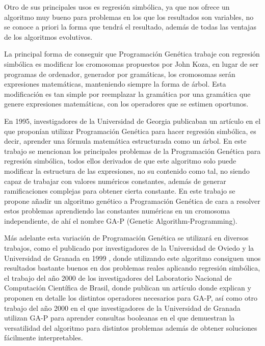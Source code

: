 


Otro de sus principales usos es regresión simbólica, ya que nos ofrece un algoritmo muy bueno para problemas en los que los resultados son variables, no se conoce a priori la forma que tendrá el resultado, además de todas las ventajas de los algoritmos evolutivos.

La principal forma de conseguir que Programación Genética trabaje con regresión simbólica es modificar los cromosomas propuestos por John Koza, en lugar de ser programas de ordenador, generador por gramáticas, los cromosomas serán expresiones matemáticas, manteniendo siempre la forma de árbol. Esta modificación es tan simple por reemplazar la gramática por una gramática que genere expresiones matemáticas, con los operadores que se estimen oportunos.

En 1995, investigadores de la Universidad de Georgia publicaban un artículo \cite{primerGAP} en el que proponían utilizar Programación Genética para hacer regresión simbólica, es decir, aprender una fórmula matemática estructurada como un árbol. En este trabajo se mencionan los principales problemas de la Programación Genética para regresión simbólica, todos ellos derivados de que este algoritmo solo puede modificar la estructura de las expresiones, no su contenido como tal, no siendo capaz de trabajar con valores numéricos constantes, además de generar ramificaciones complejas para obtener cierta constante. En este trabajo se propone añadir un algoritmo genético a Programación Genética de cara a resolver estos problemas aprendiendo las constantes numéricas en un cromosoma independiente, de ahí el nombre GA-P (Genetic Algorithm-Programming).

Más adelante esta variación de Programación Genética se utilizará en diversos trabajos, como el publicado por investigadores de la Universidad de Oviedo y la Universidad de Granada en 1999 \cite{GAPredElectrica}, donde utilizando este algoritmo consiguen unos resultados bastante buenos en dos problemas reales aplicando regresión simbólica, el trabajo del año 2000 de los investigadores del Laboratorio Nacional de Computación Científica de Brasil, donde publican un artículo \cite{PGregresionSimbolica} donde explican y proponen en detalle los distintos operadores necesarios para GA-P, así como otro trabajo del año 2000 en el que investigadores de la Universidad de Granada utilizan GA-P para aprender consultas booleanas \cite{GAPFormulasBooleanas} en el que demuestran la versatilidad del algoritmo para distintos problemas además de obtener soluciones fácilmente interpretables.



\newpage

